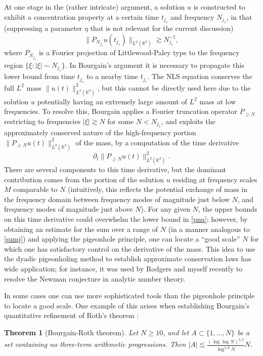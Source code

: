 \documentclass[12pt,a4paper,reqno]{amsart}
\numberwithin{equation}{section}
\theoremstyle{plain}
\newtheorem{theorem}{Theorem}[section]
\theoremstyle{definition}
\newcommand\R{\mathbb{R}}
\begin{document}
At one stage \cite[\S 4]{nls} in the (rather intricate) argument, a solution $u$ is constructed to exhibit a concentration property at a certain time $t_{j_s}$ and frequency $N_{j_s}$, in that (suppressing a parameter $\eta$ that is not relevant for the current discussion)
\begin{equation}\label{pnu}
 \| P_{N_{j_s}} u(t_{j_s}) \|_{L^2(\R^3)} \gtrsim N_{j_s}^{-1},
\end{equation}
where $P_{N_{j_s}}$ is a Fourier projection of Littlewood-Paley type to the frequency region $\{ \xi: |\xi| \sim N_{j_s}\}$.  In Bourgain's argument it is necessary to propagate this lower bound from time $t_{j_s}$ to a nearby time $t_{j_r}$.  The NLS equation conserves the full $L^2$ mass $\| u(t) \|_{L^2(\R^3)}^2$, but this cannot be directly used here due to the solution $u$ potentially having an extremely large amount of $L^2$ mass at low frequencies.  To resolve this, Bourgain applies a Fourier truncation operator $P_{\geq N}$ restricting to frequencies $|\xi| \gtrsim N$ for some $N < N_{j_s}$, and exploits the approximately conserved nature of the high-frequency portion $\| P_{\geq N} u(t) \|_{L^2(\R^3)}^2$ of the mass, by a computation of the time derivative
$$ \partial_t \| P_{\geq N} u(t) \|_{L^2(\R^3)}^2.$$
There are several components to this time derivative, but the dominant contribution comes from the portion of the solution $u$ residing at frequency scales $M$ comparable to $N$ (intuitively, this reflects the potential exchange of mass in the frequency domain between frequency modes of magnitude just below $N$, and frequency modes of magnitude just above $N$).  For any given $N$, the upper bounds on this time derivative could overwhelm the lower bound in \eqref{pnu}; however, by obtaining an estimate for the sum over a range of $N$ (in a manner analogous to \eqref{sumj}) and applying the pigeonhole principle, one can locate a ``good scale'' $N$ for which one has satisfactory control on the derivative of the mass.  This idea to use the dyadic pigeonholing method to establish approximate conservation laws has wide application; for instance, it was used by Rodgers and myself recently to resolve the Newman conjecture \cite{newman} in analytic number theory.

In some cases one can use more sophisticated tools than the pigeonhole principle to locate a good scale.  One example of this arises when establishing Bourgain's quantitative refinement \cite{roth} of Roth's theorem \cite{roth-thm}:

\begin{theorem}[Bourgain-Roth theorem]  Let $N \geq 10$, and let $A \subset \{1,\dots,N\}$ be a set containing no three-term arithmetic progressions.  Then $|A| \lesssim \frac{(\log\log N)^{1/2}}{\log^{1/2} N} N$.
\end{theorem}
\end{document}
